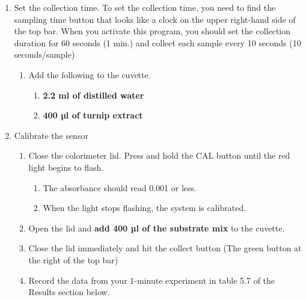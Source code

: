 \documentclass[
  letterpaper,
  DIV=11,
  numbers=noendperiod]{scrreprt}
\begin{document}
\begin{enumerate}
  \begin{enumerate}
  \def\labelenumii{\alph{enumii})}
  \item
    Set the collection time. To set the collection time, you need to
    find the sampling time button that looks like a clock on the upper
    right-hand side of the top bar. When you activate this program, you
    should set the collection duration for 60 seconds (1 min.) and
    collect each sample every 10 seconds (10 seconds/sample)

    \begin{enumerate}
    \def\labelenumiii{\roman{enumiii})}
    \item
      Add the following to the cuvette.

      \begin{enumerate}
      \def\labelenumiv{(\arabic{enumiv})}
      \item
        \textbf{2.2 ml of distilled water}
      \item
        \textbf{400 µl of turnip extract}
      \end{enumerate}
    \end{enumerate}
  \item
    Calibrate the sensor

    \begin{enumerate}
    \def\labelenumiii{\roman{enumiii})}
    \item
      Close the colorimeter lid. Press and hold the CAL button until the
      red light begins to flash.

      \begin{enumerate}
      \def\labelenumiv{(\arabic{enumiv})}
      \item
        The absorbance should read 0.001 or less.
      \item
        When the light stops flashing, the system is calibrated.
      \end{enumerate}
    \item
      Open the lid and \textbf{add 400 µl of the substrate mix} to the
      cuvette.
    \item
      Close the lid immediately and hit the collect button (The green
      button at the right of the top bar)
    \item
      Record the data from your 1-minute experiment in table 5.7 of the
      Results section below.
    \end{enumerate}
  \end{enumerate}
\end{enumerate}
\end{document}
